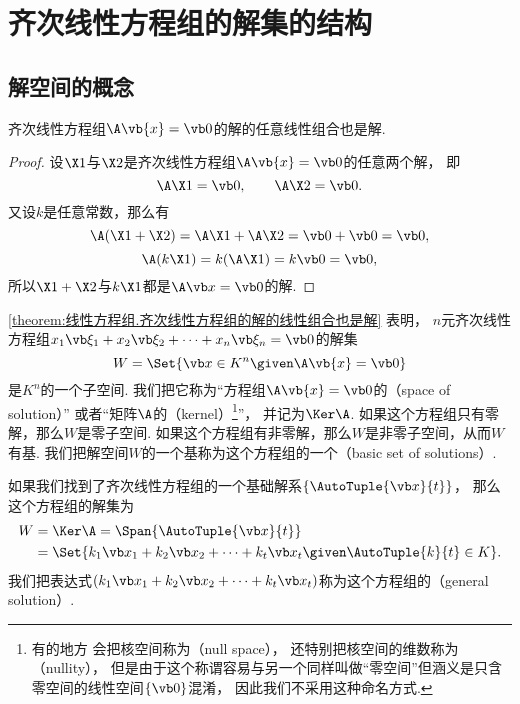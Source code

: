 \section{齐次线性方程组的解集的结构}
\subsection{解空间的概念}
\begin{proposition}\label{theorem:线性方程组.齐次线性方程组的解的线性组合也是解}
齐次线性方程组\(\A\vb{x}=\vb0\)的解的任意线性组合也是解.
\begin{proof}
设\(\X1\)与\(\X2\)是齐次线性方程组\(\A\vb{x}=\vb0\)的任意两个解，
即\[
	\A\X1=\vb0, \qquad
	\A\X2=\vb0.
\]
又设\(k\)是任意常数，那么有\[
	\A (\X1 + \X2) = \A \X1 + \A \X2 = \vb0 + \vb0 = \vb0,
\]\[
	\A (k \X1) = k (\A \X1) = k \vb0 = \vb0,
\]
所以\(\X1 + \X2\)与\(k \X1\)都是\(\A \x = \vb0\)的解.
\end{proof}
\end{proposition}

\cref{theorem:线性方程组.齐次线性方程组的解的线性组合也是解} 表明，
\(n\)元齐次线性方程组\(x_1\a_1+x_2\a_2+\dotsb+x_n\a_n=\vb0\)的解集\[
	W = \Set{
		\x \in K^n
		\given
		\A\vb{x}=\vb0
	}
\]是\(K^n\)的一个子空间.
我们把它称为“方程组\(\A\vb{x}=\vb0\)的（space of solution）”
或者“矩阵\(\A\)的（kernel）\footnote{有的地方
会把核空间称为（null space），
还特别把核空间的维数称为（nullity），
但是由于这个称谓容易与另一个同样叫做“零空间”但涵义是只含零空间的线性空间\(\{\vb0\}\)混淆，
因此我们不采用这种命名方式.}”，
并记为\(\Ker\A\).
如果这个方程组只有零解，那么\(W\)是零子空间.
如果这个方程组有非零解，那么\(W\)是非零子空间，从而\(W\)有基.
我们把解空间\(W\)的一个基称为这个方程组的一个（basic set of solutions）.

如果我们找到了齐次线性方程组的一个基础解系\(\{\AutoTuple{\x}{t}\}\)，
\def\tongjie{k_1\x_1+k_2\x_2+\dotsb+k_t\x_t}%
那么这个方程组的解集为\begin{align*}
	W &= \Ker\A
	= \Span\{\AutoTuple{\x}{t}\} \\
	&= \Set{ \tongjie \given \AutoTuple{k}{t} \in K }.
\end{align*}
我们把表达式\((\tongjie)\)称为这个方程组的（general solution）.

